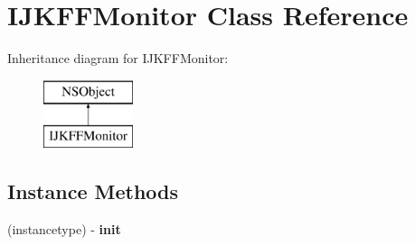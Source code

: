 \hypertarget{interface_i_j_k_f_f_monitor}{}\section{I\+J\+K\+F\+F\+Monitor Class Reference}
\label{interface_i_j_k_f_f_monitor}
Inheritance diagram for I\+J\+K\+F\+F\+Monitor\+:\begin{figure}[H]
\begin{center}
\leavevmode
\includegraphics[height=2.000000cm]{interface_i_j_k_f_f_monitor}
\end{center}
\end{figure}
\subsection*{Instance Methods}
\begin{DoxyCompactItemize}
\item 
\mbox{\label{interface_i_j_k_f_f_monitor_adfe6ec9e9decc829bfcd501f38366f18}} 
(instancetype) -\/ {\bfseries init}
\end{DoxyCompactItemize}
